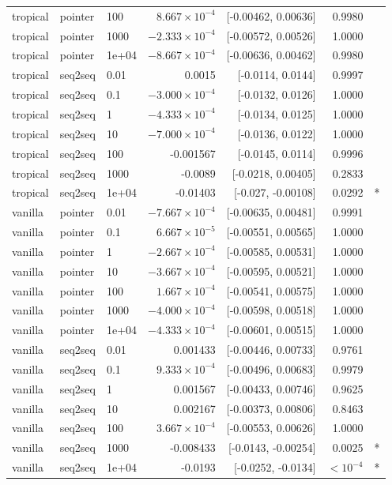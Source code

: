 \documentclass[10pt]{article}
\begin{document}
{\begin{longtable}{lllrrrl}
tropical & pointer & 100 & $8.667\times10^{-4}$ & [-0.00462, 0.00636] & 0.9980 & \\
tropical & pointer & 1000 & $-2.333\times10^{-4}$ & [-0.00572, 0.00526] & 1.0000 & \\
tropical & pointer & 1e+04 & $-8.667\times10^{-4}$ & [-0.00636, 0.00462] & 0.9980 & \\
tropical & seq2seq & 0.01 & 0.0015 & [-0.0114, 0.0144] & 0.9997 & \\
tropical & seq2seq & 0.1 & $-3.000\times10^{-4}$ & [-0.0132, 0.0126] & 1.0000 & \\
tropical & seq2seq & 1 & $-4.333\times10^{-4}$ & [-0.0134, 0.0125] & 1.0000 & \\
tropical & seq2seq & 10 & $-7.000\times10^{-4}$ & [-0.0136, 0.0122] & 1.0000 & \\
tropical & seq2seq & 100 & -0.001567 & [-0.0145, 0.0114] & 0.9996 & \\
tropical & seq2seq & 1000 & -0.0089 & [-0.0218, 0.00405] & 0.2833 & \\
tropical & seq2seq & 1e+04 & -0.01403 & [-0.027, -0.00108] & 0.0292 & *\\
vanilla & pointer & 0.01 & $-7.667\times10^{-4}$ & [-0.00635, 0.00481] & 0.9991 & \\
vanilla & pointer & 0.1 & $6.667\times10^{-5}$ & [-0.00551, 0.00565] & 1.0000 & \\
vanilla & pointer & 1 & $-2.667\times10^{-4}$ & [-0.00585, 0.00531] & 1.0000 & \\
vanilla & pointer & 10 & $-3.667\times10^{-4}$ & [-0.00595, 0.00521] & 1.0000 & \\
vanilla & pointer & 100 & $1.667\times10^{-4}$ & [-0.00541, 0.00575] & 1.0000 & \\
vanilla & pointer & 1000 & $-4.000\times10^{-4}$ & [-0.00598, 0.00518] & 1.0000 & \\
vanilla & pointer & 1e+04 & $-4.333\times10^{-4}$ & [-0.00601, 0.00515] & 1.0000 & \\
vanilla & seq2seq & 0.01 & 0.001433 & [-0.00446, 0.00733] & 0.9761 & \\
vanilla & seq2seq & 0.1 & $9.333\times10^{-4}$ & [-0.00496, 0.00683] & 0.9979 & \\
vanilla & seq2seq & 1 & 0.001567 & [-0.00433, 0.00746] & 0.9625 & \\
vanilla & seq2seq & 10 & 0.002167 & [-0.00373, 0.00806] & 0.8463 & \\
vanilla & seq2seq & 100 & $3.667\times10^{-4}$ & [-0.00553, 0.00626] & 1.0000 & \\
vanilla & seq2seq & 1000 & -0.008433 & [-0.0143, -0.00254] & 0.0025 & *\\
vanilla & seq2seq & 1e+04 & -0.0193 & [-0.0252, -0.0134] & $<10^{-4}$ & *\\
\bottomrule
\end{longtable}
}
\end{document}
